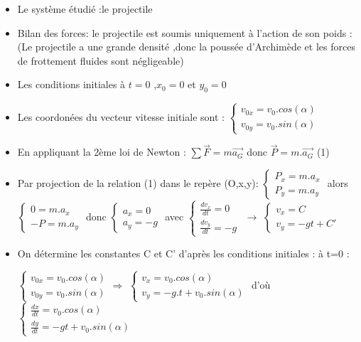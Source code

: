 \documentclass[12pt]{article}
\begin{document}
\begin{itemize}
	\item Le système étudié :{le projectile}
	\item Bilan des forces: le projectile est soumis uniquement à l'action de son poids :
		(Le projectile a une grande densité ,donc la poussée d'Archimède et les forces de frottement fluides sont négligeable)
	\item Les conditions initiales à $t=0$ ,$x_0=0$ et $y_0=0$
	\item Les coordonées du vecteur vitesse initiale sont : 
		$\begin{cases} v_{0x} = v_0.cos(\alpha)\\v_{0y} = v_0.sin(\alpha)
\end{cases}$
	\item En appliquant la 2ème loi de Newton : $\sum \vec{F}=m\vec{a_G}$ donc $\vec{P} = m.\vec{a_G}$ (1)

	\item  Par projection de la relation (1) dans le repère (O,x,y): 
$\begin{cases}P_x = m.a_x\\P_y = m.a_y\end{cases}$
 alors $\begin{cases}0 = m.a_x\\-P = m.a_y\end{cases}$
 donc $\begin{cases}a_x = 0\\a_y = -g\end{cases}$
 avec $\begin{cases}\frac{dv_x}{dt} = 0\\\frac{dv_y}{dt} = -g\end{cases}$  $\rightarrow$ 
  $\begin{cases}v_x = C\\v_y = -gt+C'\end{cases}$

\item On détermine les constantes C et C' d'après les conditions initiales : à t=0 : 

	$\begin{cases} v_{0x} = v_0.cos(\alpha)\\v_{0y} = v_0.sin(\alpha) \end{cases}  \Rightarrow$ 	
	$\begin{cases} v_{x} = v_0.cos(\alpha)\\v_{y} = -g.t +v_0.sin(\alpha) \end{cases} $
	d’où  $\begin{cases} \frac{dx}{dt} = v_0.cos(\alpha)\\\frac{dy}{dt} = -gt+v_0.sin(\alpha) \end{cases}$ 	


\end{itemize}
\end{document}
